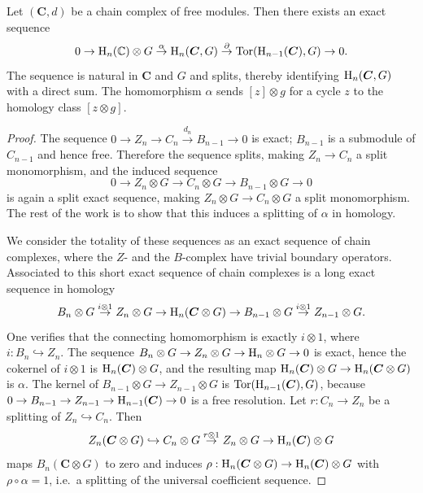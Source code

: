 \begin{prop}\label{prop 11.9.1 tomDieck}
    Let $(\bm{C},d)$ be a chain complex of free modules. Then there exists an exact sequence
    \[0\to \mathrm{H}_n(\mathbb{C})\otimes G\overset{\alpha}{\to}\mathrm{H}_n(\boldsymbol{C}, G)\overset{\partial}{\to}\operatorname{Tor}(\mathrm{H}_{n-1}(\boldsymbol{C}),G)\to 0.\]
    The sequence is natural in $\bm{C}$ and $G$ and splits, thereby identifying $\mathrm{H}_n(\boldsymbol{C},G)$ with a direct sum. The homomorphism $\alpha$ sends $[z]\otimes g$ for a cycle $z$ to the homology class $[z\otimes g]$.
\end{prop}
\begin{proof}
    The sequence $0\to Z_n\to C_n\overset{d_n}{\to}B_{n-1}\to 0$ is exact; $B_{n-1}$ is a submodule of $C_{n-1}$ and hence free. Therefore the sequence splits, making $Z_n\to C_n$ a split monomorphism, and the induced sequence
    \[0\to Z_n\otimes G\to C_n\otimes G\to B_{n-1}\otimes G\to 0\]
    is again a split exact sequence, making $Z_n\otimes G\to C_n\otimes G$ a split monomorphism. The rest of the work is to show that this induces a splitting of $\alpha$ in homology.
    
    We consider the totality of these sequences as an exact sequence of chain complexes, where the $Z$- and the $B$-complex have trivial boundary operators. Associated to this short exact sequence of chain complexes is a long exact sequence in homology
    \[B_n\otimes G\overset{i\otimes 1}{\to} Z_n\otimes G\to \mathrm{H}_n(\boldsymbol{C}\otimes G)\to B_{n-1}\otimes G\overset{i\otimes 1}{\to }Z_{n-1}\otimes G.\]
    One verifies that the connecting homomorphism is exactly $i\otimes 1$, where $i:B_n\hookrightarrow Z_n$. The sequence $B_n\otimes G\to Z_n\otimes G\to \mathrm{H}_n\otimes G\to 0$ is exact, hence the cokernel of $i\otimes 1$ is $\mathrm{H}_n(\boldsymbol{C})\otimes G$, and the resulting map $\mathrm{H}_n(\boldsymbol{C})\otimes G\to \mathrm{H}_n(\boldsymbol{C}\otimes G)$ is $\alpha$. The kernel of $B_{n-1}\otimes G\to Z_{n-1}\otimes G$ is $\operatorname{Tor}(\mathrm{H}_{n-1}(\boldsymbol{C}),G)$, because $0\to B_{n-1}\to Z_{n-1}\to \mathrm{H}_{n-1}(\boldsymbol{C})\to 0$ is a free resolution. Let $r:C_n\to Z_n$ be a splitting of $Z_n\hookrightarrow C_n$. Then
    \[Z_n(\boldsymbol{C}\otimes G)\hookrightarrow C_n\otimes G\overset{r\otimes 1}{\to}Z_n\otimes G\to \mathrm{H}_n(\boldsymbol{C})\otimes G\]
    maps $B_n(\bm{C}\otimes G)$ to zero and induces $\rho:\mathrm{H}_n(\boldsymbol{C}\otimes G)\to \mathrm{H}_n(\boldsymbol{C})\otimes G$ with $\rho\circ\alpha=1$, i.e.~a splitting of the universal coefficient sequence.
\end{proof}


